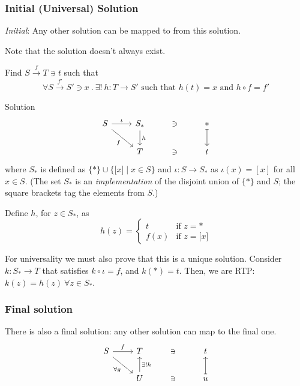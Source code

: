 \documentclass[a4paper, 12pt]{article}
\theoremstyle{definition}
\newcommand{\setof}[1]{ \{ #1 \} }
\newcommand{\bigsetof}[1]{ \big\{ #1 \big\} }
\newcommand{\suchthat}{\mid}
\newcommand{\union}{\cup}
\begin{document}
\subsubsection*{Initial (Universal) Solution}

\emph{Initial}: Any other solution can be mapped to from this solution. 

Note that the solution doesn't always exist.

Find $S \overset{f}{\rightarrow} T \ni t$ such that
$$
\forall S \overset{f'}{\rightarrow} S' \ni x \ .\ 
\exists!\ h : T \rightarrow S' \text{ such that }
h(t) = x \text{ and }
h \circ f = f'
$$

Solution
$$
    \begin{tikzcd}
        S \arrow[r, "\iota"]
          \arrow[dr, swap, "f"]
          & 
        S_{\ast} 
        \arrow[d, "h"]
        & \ni & \ast
        \arrow[d, mapsto]
          \\
        {}
          &
        T & \ni & t
    \end{tikzcd}
$$
where $S_\ast$ is defined as 
$\setof{ \ast } \union \bigsetof{ \lbrack x\rbrack \suchthat x \in S }$
and $\iota: S \to S_\ast$ as $\iota(x)=[x]$ for all $x\in S$.  
%
(The set $S_\ast$ is an \emph{implementation} of the disjoint union of
$\setof{*}$ and $S$; the square brackets tag the elements from $S$.)

Define $h$, for $z\in S_\ast$, as
\begin{equation*}
    h(z) = \begin{cases}
        t & \text{if } z = \ast\\
        f(x) & \text{if } z = \lbrack x \rbrack 
    \end{cases}
\end{equation*}

For universality we must also prove that this is a unique solution.
Consider $k:S_\ast\to T$ that satisfies $k \circ \iota = f$, and 
$k(\ast) = t$. Then, we are RTP: $k(z) = h(z)\ \forall z \in S_\ast$.

\subsubsection*{Final solution}

There is also a final solution: any other solution can map to the final one.
$$
    \begin{tikzcd}
        S \arrow[r, "f"]
          \arrow[dr, swap, "\forall g"]
          & 
        T & \ni & t
          \\
        {}
          &
          U 
          \arrow[u, swap, "\exists! h"]
          & \ni & u
          \arrow[u, swap, mapsto]
    \end{tikzcd}
$$
\end{document}
